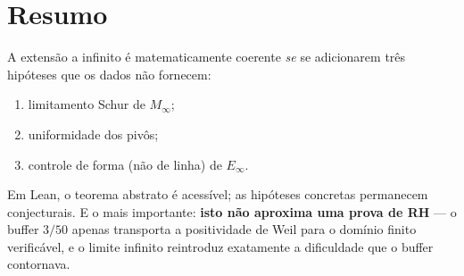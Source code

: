 \documentclass[11pt,a4paper]{article}
\theoremstyle{definition}
\theoremstyle{remark}
\begin{document}
\section*{Resumo}

A extensão a infinito é matematicamente coerente \emph{se} se adicionarem três
hipóteses que os dados não fornecem:
\begin{enumerate}[label=(\roman*)]
  \item limitamento Schur de \(M_\infty\);
  \item uniformidade dos pivôs;
  \item controle de forma (não de linha) de \(E_\infty\).
\end{enumerate}
Em Lean, o teorema abstrato é acessível; as hipóteses concretas permanecem
conjecturais. E o mais importante: \textbf{isto não aproxima uma prova de RH}
--- o buffer \(3/50\) apenas transporta a positividade de Weil para o domínio
finito verificável, e o limite infinito reintroduz exatamente a dificuldade
que o buffer contornava.
\end{document}
